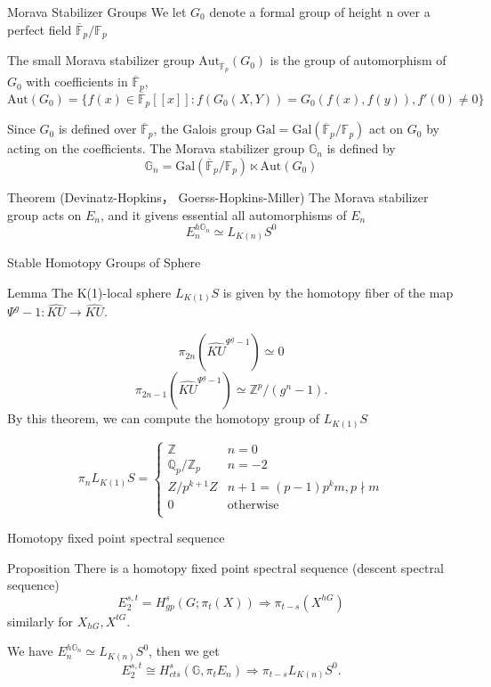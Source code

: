 \documentclass[aspectratio=1610]{ctexbeamer}
\def  \Aut      {\mathrm{Aut}}
\def  \Gal      {\mathrm{Gal}}
\def  \bF       {\mathbb{F}}
\def  \bq       {\mathbb{Q}}
\def  \bz       {\mathbb{Z}}
\begin{document}
\begin{frame}{Morava Stabilizer Groups}
	We let  $G_0$ denote a formal group  of height n over a perfect field $\overline{\bF}_p/\bF_{p}$
	
	
	The small Morava stabilizer group  $\Aut_{\overline{\bF}_p}(G_0)$ is the group of automorphism of $G_0$ with coefficients in $\overline{\bF}_p$,
	$$
	\Aut(G_0) =  \{ f(x) \in  \overline{\bF}_p[[x]]:  f (G_0 (X,Y)) =  G_0 (f(x),f(y)), f'(0) \neq 0 \}
	$$
	
	Since $G_0$ is defined over $\overline{\bF}_p$, the Galois group $\Gal = \Gal (\overline{\bF}_p/ \bF_p)$ act on $G_0$ by acting on the coefficients. 
		The Morava stabilizer  group $\mathbb{G}_n$ is defined by 
		$$
		\mathbb{G}_n = \mathrm{Gal}(\overline{\bF}_p/ \bF_p) \ltimes \Aut(G_0)
		$$
	

	
	
	\begin{alertblock}{Theorem (Devinatz-Hopkins， Goerss-Hopkins-Miller)}
		The Morava stabilizer group acts on $E_n$,  and  it givens essential all automorphisms of $E_n$
		$$
		E_n^{h\mathbb{G}_n} \simeq L_{K(n)}S^0
		$$
	\end{alertblock}

\end{frame}




\begin{frame}{Stable Homotopy Groups of Sphere }
	\begin{alertblock}{Lemma}
		The K(1)-local sphere $L_{K(1)}S$ is given by the homotopy fiber of the map $\Psi^g -1 :  \widehat{KU} \to \widehat{KU}$.
	\end{alertblock}
	
	$$
	\pi_{2n}(\widehat{KU}^{\Psi^g-1}) \simeq 0
	$$
	$$
	\pi_{2n-1}(\widehat{KU}^{\Psi^g-1}) \simeq \bz^p /(g^n-1).
	$$
	By this theorem, we can compute the homotopy group of $L_{K(1)}S$
	
	$$
	\pi_n L_{K(1)}S=  \left  \{
	\begin{array}{cccc}
		\bz  &     n=0 \\
		\bq_p  /\bz_p   &     n=-2 \\
		Z/p^{k+1}Z  &     n + 1 = (p-1)p^km, p \nmid m \\
		0   &     \text{otherwise} \\
	\end{array}
	\right.
	$$
\end{frame}




\begin{frame}{Homotopy fixed point spectral sequence}
	

	\begin{alertblock}{Proposition}
		There is a homotopy fixed point spectral sequence (descent spectral sequence)
		$$
		E_2^{s,t} = H^{s}_{gp}(G; \pi_t(X)) \Longrightarrow \pi_{t-s}(X^{hG})
		$$
		similarly for $X_{hG}, X^{tG}$.
	\end{alertblock}
	We have $	E_n^{h\mathbb{G}_n} \simeq L_{K(n)}S^0$, then we get
	$$
	E_2^{s,t} \cong H^{s}_{cts}(\mathbb{G},  \pi_tE_n) \Longrightarrow \pi_{t-s}L_{K(n)} S^0 .
	$$
\end{frame}
\end{document}
